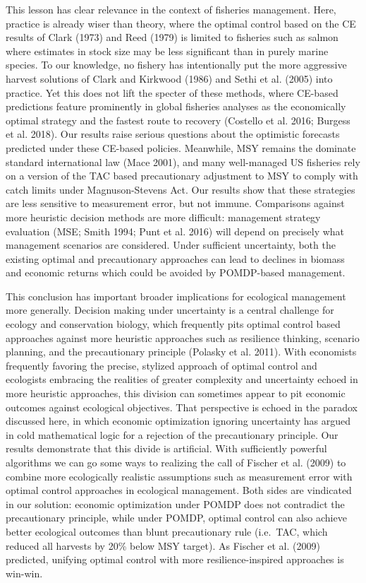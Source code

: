 \documentclass[3p]{elsarticle} %
\begin{document}
This lesson has clear relevance in the context of fisheries management.
Here, practice is already wiser than theory, where the optimal control
based on the CE results of Clark (1973) and Reed (1979) is limited to
fisheries such as salmon where estimates in stock size may be less
significant than in purely marine species. To our knowledge, no fishery
has intentionally put the more aggressive harvest solutions of Clark and
Kirkwood (1986) and Sethi et al. (2005) into practice. Yet this does not
lift the specter of these methods, where CE-based predictions feature
prominently in global fisheries analyses as the economically optimal
strategy and the fastest route to recovery (Costello et al. 2016;
Burgess et al. 2018). Our results raise serious questions about the
optimistic forecasts predicted under these CE-based policies. Meanwhile,
MSY remains the dominate standard international law (Mace 2001), and
many well-managed US fisheries rely on a version of the TAC based
precautionary adjustment to MSY to comply with catch limits under
Magnuson-Stevens Act. Our results show that these strategies are less
sensitive to measurement error, but not immune. Comparisons against more
heuristic decision methods are more difficult: management strategy
evaluation (MSE; Smith 1994; Punt et al. 2016) will depend on precisely
what management scenarios are considered. Under sufficient uncertainty,
both the existing optimal and precautionary approaches can lead to
declines in biomass and economic returns which could be avoided by
POMDP-based management.

This conclusion has important broader implications for ecological
management more generally. Decision making under uncertainty is a
central challenge for ecology and conservation biology, which frequently
pits optimal control based approaches against more heuristic approaches
such as resilience thinking, scenario planning, and the precautionary
principle (Polasky et al. 2011). With economists frequently favoring the
precise, stylized approach of optimal control and ecologists embracing
the realities of greater complexity and uncertainty echoed in more
heuristic approaches, this division can sometimes appear to pit economic
outcomes against ecological objectives. That perspective is echoed in
the paradox discussed here, in which economic optimization ignoring
uncertainty has argued in cold mathematical logic for a rejection of the
precautionary principle. Our results demonstrate that this divide is
artificial. With sufficiently powerful algorithms we can go some ways to
realizing the call of Fischer et al. (2009) to combine more ecologically
realistic assumptions such as measurement error with optimal control
approaches in ecological management. Both sides are vindicated in our
solution: economic optimization under POMDP does not contradict the
precautionary principle, while under POMDP, optimal control can also
achieve better ecological outcomes than blunt precautionary rule
(i.e.~TAC, which reduced all harvests by 20\% below MSY target). As
Fischer et al. (2009) predicted, unifying optimal control with more
resilience-inspired approaches is win-win.
\end{document}
